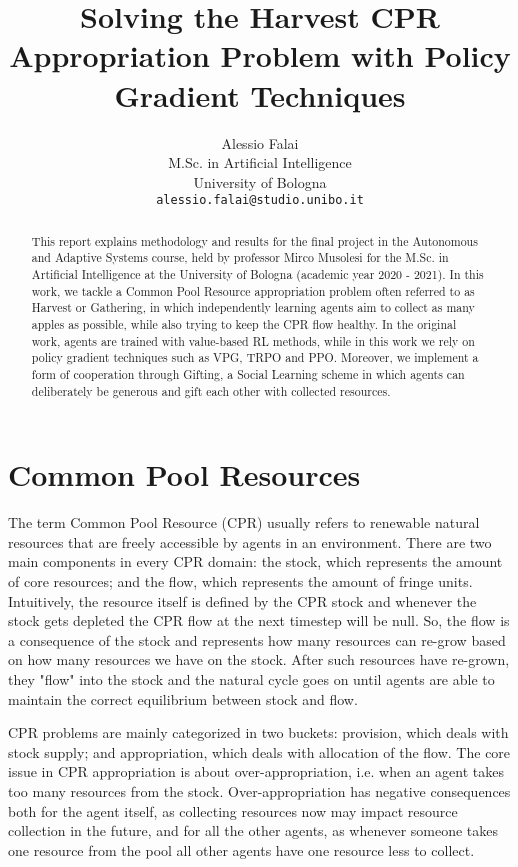 \documentclass{article}
\title{Solving the Harvest CPR Appropriation Problem with Policy Gradient Techniques}
\author{
  Alessio Falai\\
  M.Sc. in Artificial Intelligence\\
  University of Bologna\\
  \texttt{alessio.falai@studio.unibo.it} \\
}
\begin{document}
\maketitle

\begin{abstract}
  This report explains methodology and results for the final project in the Autonomous and Adaptive Systems course, held by professor Mirco Musolesi for the M.Sc. in Artificial Intelligence at the University of Bologna (academic year 2020 - 2021). In this work, we tackle a Common Pool Resource appropriation problem often referred to as Harvest or Gathering, in which independently learning agents aim to collect as many apples as possible, while also trying to keep the CPR flow healthy. In the original work, agents are trained with value-based RL methods, while in this work we rely on policy gradient techniques such as VPG, TRPO and PPO. Moreover, we implement a form of cooperation through Gifting, a Social Learning scheme in which agents can deliberately be generous and gift each other with collected resources.
\end{abstract}

\section{Common Pool Resources}
The term Common Pool Resource (CPR) usually refers to renewable natural resources that are freely accessible by agents in an environment. There are two main components in every CPR domain: the stock, which represents the amount of core resources; and the flow, which represents the amount of fringe units. Intuitively, the resource itself is defined by the CPR stock and whenever the stock gets depleted the CPR flow at the next timestep will be null. So, the flow is a consequence of the stock and represents how many resources can re-grow based on how many resources we have on the stock. After such resources have re-grown, they "flow" into the stock and the natural cycle goes on until agents are able to maintain the correct equilibrium between stock and flow. 

CPR problems are mainly categorized in two buckets: provision, which deals with stock supply; and appropriation, which deals with allocation of the flow. The core issue in CPR appropriation is about over-appropriation, i.e. when an agent takes too many resources from the stock. Over-appropriation has negative consequences both for the agent itself, as collecting resources now may impact resource collection in the future, and for all the other agents, as whenever someone takes one resource from the pool all other agents have one resource less to collect.
\end{document}
